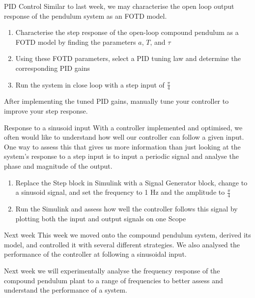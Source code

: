 \documentclass[9pt]{beamer-control}
\begin{document}
\begin{frame}{PID Control}
Similar to last week, we may characterise the open loop output response of the pendulum system as an FOTD model.

\begin{enumerate}
	\item Characterise the step response of the open-loop compound pendulum as a FOTD model by finding the parameters $a$, $T$, and $\tau$
	\item Using these FOTD parameters, select a PID tuning law and determine the corresponding PID gains
	\item Run the system in close loop with a step input of $\tfrac{\pi}{4}$
	
\end{enumerate}

After implementing the tuned PID gains, manually tune your controller to improve your step response.

\end{frame}




\begin{frame}{Response to a sinusoid input}
With a controller implemented and optimised, we often would like to understand how well our controller can follow a given input. One way to assess this that gives us more information than just looking at the system's response to a step input is to input a periodic signal and analyse the phase and magnitude of the output.

\begin{enumerate}
	\item Replace the Step block in Simulink with a Signal Generator block, change to a sinusoid signal, and set the frequency to 1 Hz and the amplitude to $\tfrac{\pi}{4}$
	\item Run the Simulink and assess how well the controller follows this signal by plotting both the input and output signals on one Scope
\end{enumerate}

\end{frame}



\begin{frame}{Next week}
	This week we moved onto the compound pendulum system, derived its model, and controlled it with several different strategies. We also analysed the performance of the controller at following a sinusoidal input.
	
	Next week we will experimentally analyse the frequency response of the compound pendulum plant to a range of frequencies to better assess and understand the performance of a system.
\end{frame}
\end{document}
